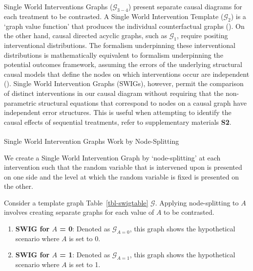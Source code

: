 \documentclass[
  single column]{article}
\makeatletter
\let\oldparagraph\paragraph
\renewcommand{\paragraph}{
    \@ifstar
      \xxxParagraphStar
      \xxxParagraphNoStar
  }
\newcommand{\xxxParagraphStar}[1]{\oldparagraph*{#1}\mbox{}}
\newcommand{\xxxParagraphNoStar}[1]{\oldparagraph{#1}\mbox{}}
\providecommand{\tightlist}{%
  \setlength{\itemsep}{0pt}\setlength{\parskip}{0pt}}\usepackage{longtable,booktabs,array}
\makeatother
\begin{document}
\begin{table}

\caption{\label{tbl-swigtable}Single World Interventions Graphs
(\(\mathcal{G}_{3-4}\)) present separate causal diagrams for each
treatment to be contrasted. A Single World Intervention Template
(\(\mathcal{G}_{2}\)) is a `graph value function' that produces the
individual counterfactual graphs
(). On the
other hand, causal directed acyclic graphs, such as \(\mathcal{G}_1\),
require positing interventional distributions. The formalism
underpinning these interventional distributions is mathematically
equivalent to formalism underpinning the potential outcomes framework,
assuming the errors of the underlying structural causal models that
define the nodes on which interventions occur are independent
(). Single
World Intervention Graphs (SWIGs), however, permit the comparison of
distinct interventions in our causal diagram without requiring that the
non-parametric structural equations that correspond to nodes on a causal
graph have independent error structures. This is useful when attempting
to identify the causal effects of sequential treatments, refer to
supplementary materials \textbf{S2}.}

\centering{

\swigtable

}

\end{table}%

\paragraph{Single World Intervention Graphs Work by
Node-Splitting}\label{single-world-intervention-graphs-work-by-node-splitting}

We create a Single World Intervention Graph by `node-splitting' at each
intervention such that the random variable that is intervened upon is
presented on one side and the level at which the random variable is
fixed is presented on the other.

Consider a template graph Table~\ref{tbl-swigtable} \(\mathcal{G}\).
Applying node-splitting to \(A\) involves creating separate graphs for
each value of \(A\) to be contrasted.

\begin{enumerate}
\def\labelenumi{\arabic{enumi}.}
\tightlist
\item
  \textbf{SWIG for \(A\) = 0}: Denoted as \(\mathcal{G}_{A=0}\), this
  graph shows the hypothetical scenario where \(A\) is set to 0.
\item
  \textbf{SWIG for \(A\) = 1}: Denoted as \(\mathcal{G}_{A=1}\), this
  graph shows the hypothetical scenario where \(A\) is set to 1.
\end{enumerate}
\end{document}

